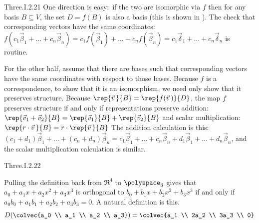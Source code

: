 \begin{ans}{Three.I.2.21}
       One direction is easy:~if the two are isomorphic via \( f \)
       then for any basis \( B\subseteq V \),
       the set \( D=f(B) \) is also a basis (this is shown in
       ).
       The check that corresponding vectors have the same coordinates:
       \( f(c_1\vec{\beta}_1+\dots+c_n\vec{\beta}_n)
          =c_1f(\vec{\beta}_1)+\dots+c_nf(\vec{\beta}_n)
          =c_1\vec{\delta}_1+\dots+c_n\vec{\delta}_n   \)
       is routine.

       For the other half, assume that there are bases such that corresponding
       vectors have the same coordinates with respect to those bases.
       Because \( f \) is a correspondence, to show that it is an isomorphism,
       we need only show that it preserves structure.
       Because \( \rep{\vec{v}\,}{B}=\rep{f(\vec{v}\,)}{D} \), the
       map \( f \) preserves structure if and only if
       representations preserve addition:
       \( \rep{\vec{v}_1+\vec{v}_2}{B}=\rep{\vec{v}_1}{B}+\rep{\vec{v}_2}{B} \)
       and scalar multiplication:
       \( \rep{r\cdot\vec{v}\,}{B}=r\cdot\rep{\vec{v}\,}{B} \)
       The addition calculation is this:
       \( (c_1+d_1)\vec{\beta}_1+\dots+(c_n+d_n)\vec{\beta}_n
          =c_1\vec{\beta}_1+\dots+c_n\vec{\beta}_n
          +d_1\vec{\beta}_1+\dots+d_n\vec{\beta}_n \),
       and the scalar multiplication calculation is similar.
     
\end{ans}
\begin{ans}{Three.I.2.22}
       \begin{exparts}
        \partsitem Pulling the definition back from
          \( \Re^4 \) to \( \polyspace_3 \)
          gives that \( a_0+a_1x+a_2x^2+a_3x^3 \) is orthogonal to
          \( b_0+b_1x+b_2x^2+b_3x^3 \) if and only if
          \( a_0b_0+a_1b_1+a_2b_2+a_3b_3=0 \).
        \partsitem A natural definition is this.
          \begin{equation*}
            D(\colvec{a_0 \\ a_1 \\ a_2 \\ a_3})=
              \colvec{a_1 \\ 2a_2 \\ 3a_3 \\ 0}
          \end{equation*}
      \end{exparts}
    
\end{ans}
